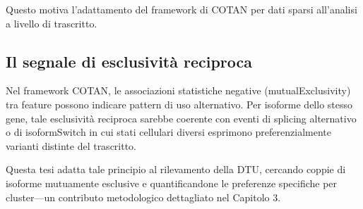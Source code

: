 Questo motiva l'adattamento del framework di COTAN per dati sparsi all'analisi a livello di trascritto.


\subsection{Il segnale di esclusività reciproca}
Nel framework COTAN, le associazioni statistiche negative (\gls{mutualExclusivity}) tra feature possono indicare pattern di uso alternativo. Per isoforme dello stesso gene, tale esclusività reciproca sarebbe coerente con eventi di splicing alternativo o di \gls{isoformSwitch} in cui stati cellulari diversi esprimono preferenzialmente varianti distinte del trascritto.

Questa tesi adatta tale principio al rilevamento della DTU, cercando coppie di isoforme mutuamente esclusive e quantificandone le preferenze specifiche per cluster---un contributo metodologico dettagliato nel Capitolo 3.

